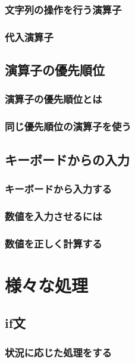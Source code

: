 \documentclass[11pt,a4paper]{jreport}
\begin{document}
\subsection{文字列の操作を行う演算子}

\subsection{代入演算子}


\section{演算子の優先順位}
\subsection{演算子の優先順位とは}

\subsection{同じ優先順位の演算子を使う}

\section{キーボードからの入力}
\subsection{キーボードから入力する}

\subsection{数値を入力させるには}

\subsection{数値を正しく計算する}


\chapter{様々な処理}%
\section{if文}

\subsection{状況に応じた処理をする}
\end{document}
